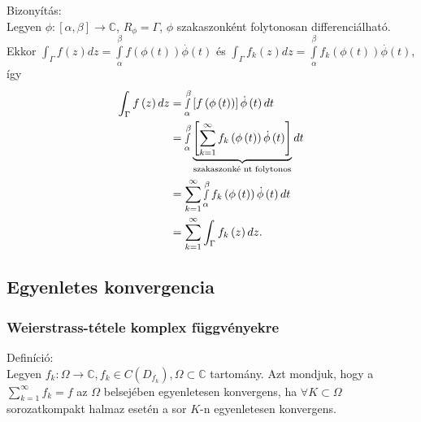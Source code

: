 \documentclass[12pt,a4paper]{scrartcl}
\newenvironment{definicio}{}{}
\newenvironment{bizonyitas}{}{}
\begin{document}
\begin{bizonyitas}

Bizonyítás:\\
Legyen
\(\left. \phi:\left\lbrack {\alpha,\beta} \right\rbrack\rightarrow{\mathbb{C}} \right.\),
\(R_{\phi} = \Gamma\), \(\phi\) szakaszonként folytonosan
differenciálható. Ekkor
\({\int_{\Gamma}{f\left( z \right)dz}} = {\int\limits_{\alpha}^{\beta}{f\left( {\phi\left( t \right)} \right)\overset{.}{\phi}\left( t \right)}}\)
és
\({\int_{\Gamma}{f_{k}\left( z \right)dz}} = {\int\limits_{\alpha}^{\beta}{f_{k}\left( {\phi\left( t \right)} \right)\overset{.}{\phi}\left( t \right)}}\),
így \[\begin{aligned}
  \int_\Gamma  {f\left( z \right)dz}  &  = \mathop \smallint \limits_\alpha ^\beta  \left[ {f\left( {\phi \left( t \right)} \right)} \right]\dot \phi \left( t \right)dt \\ 
   &  = \mathop \smallint \limits_\alpha ^\beta  \underbrace {\left[ {\mathop \sum \limits_{k = 1}^\infty  {f_k}\left( {\phi \left( t \right)} \right)\dot \phi \left( t \right)} \right]}_{{\text{szakaszonk\'e nt folytonos}}}dt \\ 
   &  = \mathop \sum \limits_{k = 1}^\infty  \mathop \smallint \limits_\alpha ^\beta  {f_k}\left( {\phi \left( t \right)} \right)\dot \phi \left( t \right)dt \\ 
   &  = \mathop \sum \limits_{k = 1}^\infty  \int_\Gamma  {{f_k}\left( z \right)dz} . \\ 
\end{aligned} \]

\end{bizonyitas}

\hypertarget{egyenletes-konvergencia}{%
\subsection{Egyenletes konvergencia}\label{egyenletes-konvergencia}}

\hypertarget{weierstrass-tetele-komplex-fuggvenyekre}{%
\subsubsection{Weierstrass-tétele komplex
függvényekre}\label{weierstrass-tetele-komplex-fuggvenyekre}}

\begin{definicio}

Definíció:\\
Legyen
\(\left. f_{k}:\Omega\rightarrow{\mathbb{C}},f_{k} \in C\left( D_{f_{k}} \right),\Omega \subset {\mathbb{C}} \right.\)
tartomány. Azt mondjuk, hogy a
\({\sum\limits_{k = 1}^{\infty}f_{k}} = f\) az \(\Omega\) belsejében
egyenletesen konvergens, ha \(\forall K \subset \Omega\) sorozatkompakt
halmaz esetén a sor \(K\)-n egyenletesen konvergens.

\end{definicio}
\end{document}
